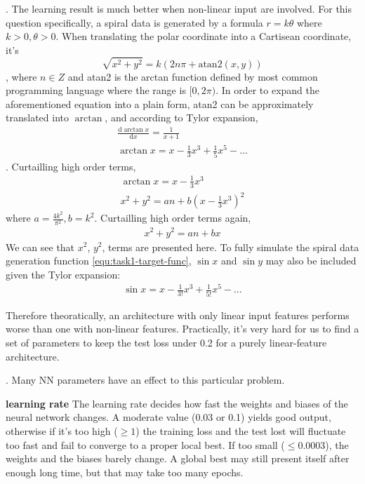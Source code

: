 \documentclass[12pt]{article}
\begin{document}
.
The learning result is much better when non-linear input are involved. For this question specifically, a spiral data is generated by a formula $r=k\theta$ where $k>0, \theta>0$. When translating the polar coordinate into a Cartisean coordinate, it's 
\begin{equation}
\label{equ:task1-target-func}
\sqrt{x^2+y^2}=k(2n\pi+\textrm{atan2}(x,y))
\end{equation}
, where $n\in Z$ and atan2 is the arctan function defined by most common programming language where the range is $[0,2\pi)$. In order to expand the aforementioned equation into a plain form, atan2 can be approximately translated into $\arctan$, and according to Tylor expansion, 
\begin{gather*}
\frac{\textrm{d}\arctan x}{\textrm{d}x}=\frac{1}{x+1}\\
\arctan x=x-\frac{1}{3}x^3+\frac{1}{5}x^5-\ldots
\end{gather*}
. Curtailling high order terms, 
\begin{gather*}
\arctan x=x-\frac{1}{3}x^3\\
x^2+y^2=an+b(x-\frac{1}{3}x^3)^2
\end{gather*}
where $a=\frac{4k^2}{\pi^2},b=k^2$. Curtailling high order terms again, 
\begin{gather*}
x^2+y^2=an+bx
\end{gather*}
We can see that $x^2$, $y^2$, terms are presented here. To fully simulate the spiral data generation function \ref{equ:task1-target-func}, $\sin x$ and $\sin y$ may also be included given the Tylor expansion:
\begin{gather*}
\sin x=x-\frac{1}{3!}x^3+\frac{1}{5!}x^5-\ldots
\end{gather*}

Therefore theoratically, an architecture with only linear input features performs worse than one with non-linear features. Practically, it's very hard for us to find a set of parameters to keep the test loss under 0.2 for a purely linear-feature architecture.

. Many NN parameters have an effect to this particular problem.

\noindent \textbf{learning rate} The learning rate decides how fast the weights and biases of the neural network changes. A moderate value (0.03 or 0.1) yields good output, otherwise if it's too high ($\geq 1$) the training loss and the test lost will fluctuate too fast and fail to converge to a proper local best. If too small ($\leq 0.0003$), the weights and the biases barely change. A global best may still present itself after enough long time, but that may take too many epochs.
\end{document}
